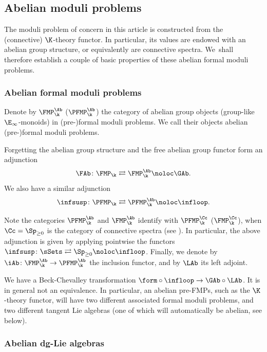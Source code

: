 \subsection{Abelian moduli problems}\label{subsec:abelianfmp}

The moduli problem of concern in this article is constructed from the (connective) $\K$-theory functor. In particular, its values are endowed with an abelian group structure, or equivalently are connective spectra. We~shall therefore establish a couple of basic properties of these abelian formal moduli problems.

\subsubsection{Abelian formal moduli problems}
Denote by $\FMP_\k^\Ab$ (\resp $\PFMP_\k^\Ab$) the category of abelian group objects (\ie group-like $\E_\infty$-monoids) in (pre-)formal moduli problems.
We call their objects abelian (pre-)formal moduli problems.

Forgetting the abelian group structure and the free abelian group functor form an adjunction\vspace*{-3pt}
\[
\FAb \colon \FMP_\k \rightleftarrows \FMP_\k^\Ab \noloc \GAb.
\]
We also have a similar adjunction\vspace*{-5pt}
\[
\infsusp \colon \PFMP_\k \rightleftarrows \PFMP_\k^\Ab \noloc \infloop.
\]

Note the categories $\PFMP_\k^\Ab$ and $\FMP^\Ab_\k$ identify with $\PFMP_\k^\Cc$ (\resp $\FMP_\k^\Cc$), when $\Cc = \Sp_{\geq 0}$ is the category of connective spectra (see \cite[Rem.\,5.2.6.26]{lurie:halg}). In particular, the above adjunction is given by applying pointwise the functors $\infsusp \colon \sSets \rightleftarrows \Sp_{\geq 0} \noloc \infloop$. Finally, we denote by $\iAb \colon \FMP_\k^\Ab \to \PFMP_\k^\Ab$ the inclusion functor, and by $\LAb$ its left adjoint.

\begin{rmq}
We have a Beck-Chevalley transformation $\form \circ \operatorname{\infloop} \to \GAb \circ \LAb$. It is in general not an equivalence. In particular, an abelian pre-FMPs, such as the $\K$-theory functor, will have two different associated formal moduli problems, and two different tangent Lie algebras (one of which will automatically be abelian, see below).
\end{rmq}

\subsubsection{Abelian dg-Lie algebras}

